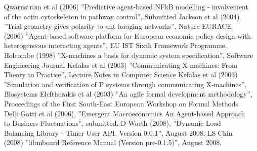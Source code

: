 \begin{thebibliography}{99}
 Qwarnstrom et al (2006) ''Predictive agent-based NFkB modelling - involvement of the actin cytoskeleton in pathway control'', Submitted
 Jackson et al (2004) ''Trial geometry gives polarity to ant foraging networks'', Nature
 EURACE (2006)  ''Agent-based software platform for European economic policy design with heterogeneous interacting agents'', EU IST Sixth Framework Programme.
 Holcombe (1998) ''X-machines a basis for dynamic system specification'', Software Engineering Journal
 Kefalas et al (2003) ''Communicating X-machines: From Theory to Practice'', Lecture Notes in Computer Science
 Kefalas et al (2003) ''Simulation and verification of P systems through communicating X-machines'', Biosystems
 Eleftherakis et al (2003) ''An agile formal development methodology'', Proceedings of the First South-East European Workshop on Formal Methods
 Delli Gatti et al (2006), ''Emergent Macroeconomics An Agent-based Approach to Business Fluctuations'', submitted.
 D Worth (2008), ''Dynamic Load Balancing Library - Timer User API, Version 0.0.1'', August 2008.
 LS Chin (2008)  ''libmboard Reference Manual (Version pre-0.1.5)'', August 2008.
\end{thebibliography}
